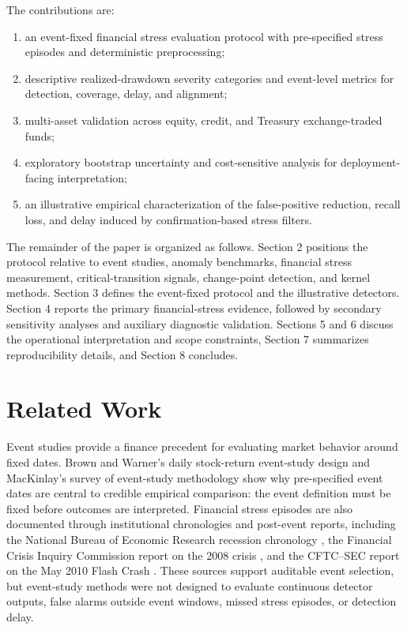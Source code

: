 \documentclass[pdflatex,sn-mathphys-num]{sn-jnl}
\begin{document}
The contributions are:
\begin{enumerate}
\item an event-fixed financial stress evaluation protocol with pre-specified stress episodes and deterministic preprocessing;
\item descriptive realized-drawdown severity categories and event-level metrics for detection, coverage, delay, and alignment;
\item multi-asset validation across equity, credit, and Treasury exchange-traded funds;
\item exploratory bootstrap uncertainty and cost-sensitive analysis for deployment-facing interpretation;
\item an illustrative empirical characterization of the false-positive reduction, recall loss, and delay induced by confirmation-based stress filters.
\end{enumerate}

The remainder of the paper is organized as follows. Section 2 positions the protocol relative to event studies, anomaly benchmarks, financial stress measurement, critical-transition signals, change-point detection, and kernel methods. Section 3 defines the event-fixed protocol and the illustrative detectors. Section 4 reports the primary financial-stress evidence, followed by secondary sensitivity analyses and auxiliary diagnostic validation. Sections 5 and 6 discuss the operational interpretation and scope constraints, Section 7 summarizes reproducibility details, and Section 8 concludes.

\section{Related Work}
Event studies provide a finance precedent for evaluating market behavior around fixed dates. Brown and Warner's daily stock-return event-study design \cite{brown1985} and MacKinlay's survey of event-study methodology \cite{mackinlay1997} show why pre-specified event dates are central to credible empirical comparison: the event definition must be fixed before outcomes are interpreted. Financial stress episodes are also documented through institutional chronologies and post-event reports, including the National Bureau of Economic Research recession chronology \cite{nber2023}, the Financial Crisis Inquiry Commission report on the 2008 crisis \cite{fcic2011}, and the CFTC--SEC report on the May 2010 Flash Crash \cite{cftcsec2010}. These sources support auditable event selection, but event-study methods were not designed to evaluate continuous detector outputs, false alarms outside event windows, missed stress episodes, or detection delay.
\end{document}

